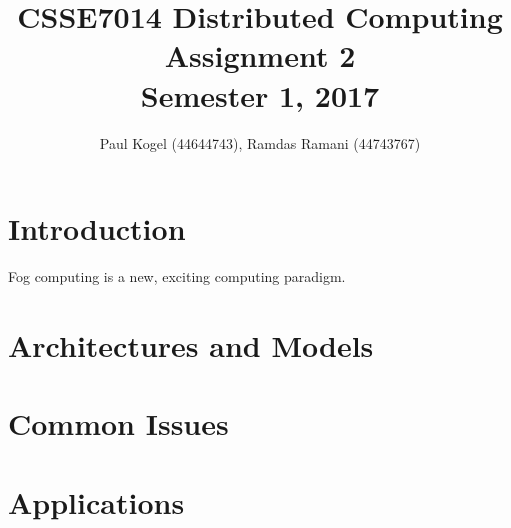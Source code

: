 \documentclass{article}
\title{CSSE7014 Distributed Computing \\
Assignment 2 \\
Semester 1, 2017}
\author{Paul Kogel (44644743), Ramdas Ramani (44743767)}
\begin{document}
\maketitle

\pagebreak
\tableofcontents\thispagestyle{plain}

\pagebreak

\section{Introduction}

Fog computing is a new, exciting computing paradigm. 

\section{Architectures and Models}
\section{Common Issues}
\section{Applications}
\end{document}
